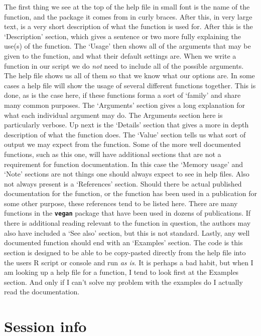 \documentclass[
]{book}
\begin{document}
The first thing we see at the top of the help file in small font is the name of the function, and the package it comes from in curly braces. After this, in very large text, is a very short description of what the function is used for. After this is the `Description' section, which gives a sentence or two more fully explaining the use(s) of the function. The `Usage' then shows all of the arguments that may be given to the function, and what their default settings are. When we write a function in our script we do \emph{not} need to include all of the possible arguments. The help file shows us all of them so that we know what our options are. In some cases a help file will show the usage of several different functions together. This is done, as is the case here, if these functions forma a sort of `family' and share many common purposes. The `Arguments' section gives a long explanation for what each individual argument may do. The Arguments section here is particularly verbose. Up next is the `Details' section that gives a more in depth description of what the function does. The `Value' section tells us what sort of output we may expect from the function. Some of the more well documented functions, such as this one, will have additional sections that are not a requirement for function documentation. In this case the `Memory usage' and `Note' sections are not things one should always expect to see in help files. Also not always present is a `References' section. Should there be actual published documentation for the function, or the function has been used in a publication for some other purpose, these references tend to be listed here. There are many functions in the \textbf{\texttt{vegan}} package that have been used in dozens of publications. If there is additional reading relevant to the function in question, the authors may also have included a `See also' section, but this is not standard. Lastly, any well documented function should end with an `Examples' section. The code is this section is designed to be able to be copy-pasted directly from the help file into the users R script or console and run \emph{as is}. It is perhaps a bad habit, but when I am looking up a help file for a function, I tend to look first at the Examples section. And only if I can't solve my problem with the examples do I actually read the documentation.

\hypertarget{session-info-2}{%
\section{Session info}\label{session-info-2}}
\end{document}
